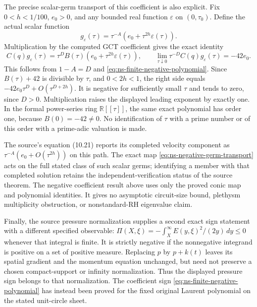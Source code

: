 The precise scalar-germ transport of this coefficient is also explicit.
Fix $0<h<1/100$, $e_0>0$, and any bounded real function
$\varepsilon$ on $(0,\tau_0)$. Define the actual scalar function
\[
 g_\varepsilon(\tau)=\tau^{-A}
          (e_0+\tau^{2h}\varepsilon(\tau)).
\]
Multiplication by the computed GCT coefficient gives the exact identity
\begin{equation}\label{eq:ns-negative-germ-transport}
 C(q)g_\varepsilon(\tau)
 =\tau^D B(\tau)(e_0+\tau^{2h}\varepsilon(\tau)),\qquad
 \lim_{\tau\downarrow0}\tau^{-D}C(q)g_\varepsilon(\tau)=-42e_0.
\end{equation}
This follows from $1-A=D$ and \eqref{eq:ns-finite-negative-polynomial}.
Since $B(\tau)+42$ is divisible by $\tau$, and $0<2h<1$, the
right side equals $-42e_0\tau^D+O(\tau^{D+2h})$.
It is negative for sufficiently small $\tau$ and tends to zero,
since $D>0$. Multiplication raises the displayed leading exponent by
exactly one. In the formal power-series ring $\mathbb R[[\tau]]$,
the same exact polynomial has order one, because $B(0)=-42\ne0$.
No identification of $\tau$ with a prime number or of this order with
a prime-adic valuation is made.

The source's equation (10.21) reports its completed velocity component
as $\tau^{-A}(e_0+O(\tau^{2h}))$ on this path. The exact map
\eqref{eq:ns-negative-germ-transport} acts on the full stated class of
such scalar germs; identifying a member with that completed solution
retains the independent-verification status of the source theorem.
The negative coefficient result above uses only the proved conic map
and polynomial identities. It gives no asymptotic circuit-size bound,
plethysm multiplicity obstruction, or nonstandard-RH eigenvalue claim.

Finally, the source pressure normalization supplies a second exact
sign statement with a different specified observable:
$\Pi(X,\xi)=-\int_X^\infty E(y,\xi)^2/(2y)\,dy\leq0$
whenever that integral is finite. It is strictly negative if the
nonnegative integrand is positive on a set of positive measure.
Replacing $p$ by $p+k(t)$ leaves its spatial gradient and the momentum
equation unchanged, but need not preserve a chosen compact-support or
infinity normalization. Thus the displayed pressure sign belongs to
that normalization. The coefficient sign
\eqref{eq:ns-finite-negative-polynomial} has instead been proved for
the fixed original Laurent polynomial on the stated unit-circle sheet.
